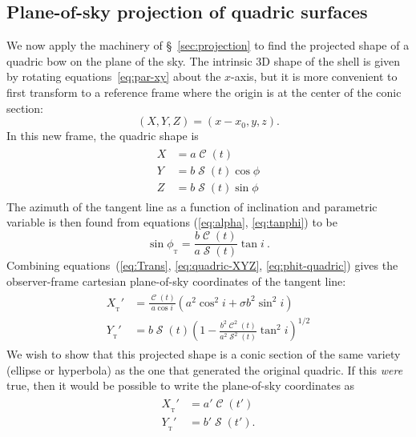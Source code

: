 \documentclass[useAMS, usenatbib, a4paper]{mnras}
\DeclareMathOperator{\Sin}{\mathcal{S}}
\DeclareMathOperator{\Cos}{\mathcal{C}}
\newcommand\T{_{\mathrm{\scriptscriptstyle T}}} %
\begin{document}
\subsection{Plane-of-sky projection of quadric surfaces} 

We now apply the machinery of \S~\ref{sec:projection} to find the
projected shape of a quadric bow on the plane of the sky.  The
intrinsic 3D shape of the shell is given by rotating
equations~\eqref{eq:par-xy} about the \(x\)-axis, but it is more
convenient to first transform to a reference frame where the origin is
at the center of the conic section:
\begin{equation}
  \label{eq:xyz-XYZ}
  (X, Y, Z) = (x - x_0, y, z) . 
\end{equation}
In this new frame, the quadric shape is
\begin{gather}
  \label{eq:quadric-XYZ}
  \begin{aligned}
    X &= a\Cos(t) \\ 
    Y &= b \Sin(t)\cos\phi \\
    Z &= b \Sin(t)\sin\phi
  \end{aligned}
\end{gather}
The azimuth of the tangent line as a function of inclination and
parametric variable is then found from equations (\ref{eq:alpha},
\ref{eq:tanphi}) to be
\begin{equation}
  \label{eq:phit-quadric}
  \sin\phi_{\T} = \frac{b \Cos(t)} {a \Sin(t)} \tan i \ .
\end{equation}
Combining equations~(\ref{eq:Trans}, \ref{eq:quadric-XYZ},
\ref{eq:phit-quadric}) gives the observer-frame cartesian
plane-of-sky coordinates of the tangent line:
\begin{gather}
  \label{eq:conic-projected-XY}
  \begin{aligned}
    X_{\T}' & = \frac{\Cos(t)}{a\cos i}
    \left(a^2\cos^2 i + \sigma b^2\sin^2 i\right)
    \\
    Y_{\T}' &= b\Sin(t)
    \left(
      1 - \frac{b^2 \Cos^2(t)}{a^2 \Sin^2(t)}
      \tan^2 i\right)^{1/2}
  \end{aligned}
\end{gather}
We wish to show that this projected shape is a conic section of the
same variety (ellipse or hyperbola) as the one that generated the
original quadric.  If this \emph{were} true, then it would be possible
to write the plane-of-sky coordinates as
\begin{gather}
  \begin{aligned}
    X_{\T}' &= a'\Cos( t')  \\
    Y_{\T}' &= b'\Sin (t')  . 
  \end{aligned}\label{eq:conic-projected-XY-conic}
\end{gather}
\end{document}
